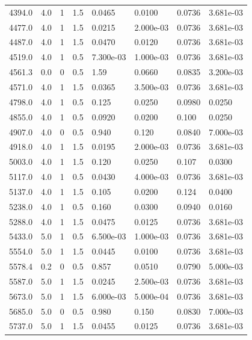 \documentclass[preview]{standalone}
\begin{document}
{{{\begin{tabular}{L{1.2cm}C{1.2cm} C{0.3cm}C{0.5cm} C{1.4cm}C{1.4cm} C{1.4cm}C{1.4cm}}
  4394.0  &   4.0  & 1     & 1.5 &  0.0465  & 0.0100  & 0.0736 &  3.681e-03   \\ 
  4477.0  &   4.0  & 1     & 1.5 &  0.0215  & 2.000e-03  & 0.0736 &  3.681e-03   \\ 
  4487.0  &   4.0  & 1     & 1.5 &  0.0470  & 0.0120  & 0.0736 &  3.681e-03   \\ 
  4519.0  &   4.0  & 1     & 0.5 &  7.300e-03  & 1.000e-03  & 0.0736 &  3.681e-03   \\ 
  4561.3  &   0.0  & 0     & 0.5 &  1.59  & 0.0660  & 0.0835 &  3.200e-03   \\ 
  4571.0  &   4.0  & 1     & 1.5 &  0.0365  & 3.500e-03  & 0.0736 &  3.681e-03   \\ 
  4798.0  &   4.0  & 1     & 0.5 &  0.125  & 0.0250  & 0.0980 &  0.0250   \\ 
  4855.0  &   4.0  & 1     & 0.5 &  0.0920  & 0.0200  & 0.100 &  0.0250   \\ 
  4907.0  &   4.0  & 0     & 0.5 &  0.940  & 0.120  & 0.0840 &  7.000e-03   \\ 
  4918.0  &   4.0  & 1     & 1.5 &  0.0195  & 2.000e-03  & 0.0736 &  3.681e-03   \\ 
  5003.0  &   4.0  & 1     & 1.5 &  0.120  & 0.0250  & 0.107 &  0.0300   \\ 
  5117.0  &   4.0  & 1     & 0.5 &  0.0430  & 4.000e-03  & 0.0736 &  3.681e-03   \\ 
  5137.0  &   4.0  & 1     & 1.5 &  0.105  & 0.0200  & 0.124 &  0.0400   \\ 
  5238.0  &   4.0  & 1     & 0.5 &  0.160  & 0.0300  & 0.0940 &  0.0160   \\ 
  5288.0  &   4.0  & 1     & 1.5 &  0.0475  & 0.0125  & 0.0736 &  3.681e-03   \\ 
  5433.0  &   5.0  & 1     & 0.5 &  6.500e-03  & 1.000e-03  & 0.0736 &  3.681e-03   \\ 
  5554.0  &   5.0  & 1     & 1.5 &  0.0445  & 0.0100  & 0.0736 &  3.681e-03   \\ 
  5578.4  &   0.2  & 0     & 0.5 &  0.857  & 0.0510  & 0.0790 &  5.000e-03   \\ 
  5587.0  &   5.0  & 1     & 1.5 &  0.0245  & 2.500e-03  & 0.0736 &  3.681e-03   \\ 
  5673.0  &   5.0  & 1     & 1.5 &  6.000e-03  & 5.000e-04  & 0.0736 &  3.681e-03   \\ 
  5685.0  &   5.0  & 0     & 0.5 &  0.980  & 0.150  & 0.0830 &  7.000e-03   \\ 
  5737.0  &   5.0  & 1     & 1.5 &  0.0455  & 0.0125  & 0.0736 &  3.681e-03   \\ 

\end{tabular}}}}
\end{document}
